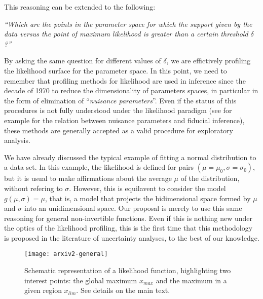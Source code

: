 \documentclass[twoside,12pt,a4paper]{article}
\begin{document}
This reasoning can be extended to the following:

{\em ``Which are the points in the parameter space for which the support given by the data 
{\em versus} the point of maximum likelihood is greater than a certain threshold $\delta$?''}

By asking the same question for different values of $\delta$, we are effictively profiling the 
likelihood surface for the parameter space. In this point, we need to remember that profiling 
methods for likelihood are used in inference since the decade of 1970 to reduce the dimensionality
of parameters spaces, in particular in the form of elimination of ``{\em nuisance parameters}''.
Even if the status of this procedures is not fully understood under the likelihood
paradigm (see for example \citep{Kalbfleisch70} for the relation between nuisance parameters and fiducial
inference), these methods are generally accepted as a valid procedure for exploratory analysis.

We have already discussed the typical example of fitting a normal distribution to a data set. In
this example, the likelihood is defined for pairs $(\mu = \mu_0, \sigma = \sigma_0)$,
but it is usual to make affirmations about the average $\mu$ of the distribution, without refering to $\sigma$.
However, this is equilavent to consider the model $g(\mu, \sigma) = \mu$, that is, a model that
projects the bidimensional space formed by $\mu$ and $\sigma$ into an unidimensional space. Our proposal
is merely to use this same reasoning for general non-invertible functions. Even if this is nothing
new under the optics of the likelihood profiling, this is the first time that this methodology is proposed
in the literature of uncertainty analyses, to the best of our knowledge.

\begin{figure}[htb]
\texttt{[image: arxiv2-general]}
	\caption{Schematic representation of a likelihood function, highlighting two interest points: the
  global maximum $x_{max}$ and the maximum in a given region $x_{lim}$. See details on the main text.} 
	\label{fig:esquema}
\end{figure}
\end{document}
